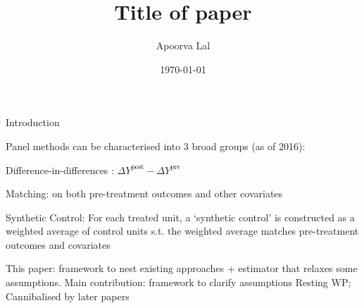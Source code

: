 \documentclass[12pt, aspectratio=169]{beamer}
\begin{document}
\title{Title of paper}
\author{Apoorva Lal}
\date{\today}

\frame{\titlepage}




\begin{frame}{Introduction}


\bi
  \item Panel methods can be characterised into 3 broad groups (as of 2016):
    \bi
      \item Difference-in-differences : $\Delta Y^{\text{post}} - \Delta Y^{\text{pre}}$
      \item Matching: on both pre-treatment outcomes and other covariates
      \item Synthetic Control: For each treated unit, a `synthetic
        control' is constructed as a weighted average of control units
        s.t. the weighted average matches pre-treatment outcomes and
        covariates
    \ei
  \item This paper: framework to nest existing approaches + estimator
  that relaxes some assumptions.
  \bi
    \I Main contribution: framework to clarify assumptions
    \I Resting WP; Cannibalised by later papers
    \I \textcite{Arkhangelsky2020-sz}
  \ei
\ei

\end{frame}
\end{document}
